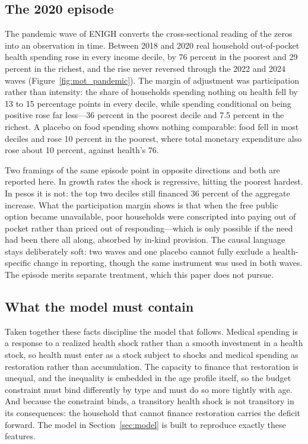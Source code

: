 \subsection{The 2020 episode}
\label{subsec:mot_pandemic}

The pandemic wave of ENIGH converts the cross-sectional reading of the zeros
into an observation in time. Between 2018 and 2020 real household out-of-pocket
health spending rose in every income decile, by 76 percent in the poorest and 29
percent in the richest, and the rise never reversed through the 2022 and 2024
waves (Figure~\ref{fig:mot_pandemic}). The margin of adjustment was
participation rather than intensity: the share of households spending nothing on
health fell by 13 to 15 percentage points in every decile, while spending
conditional on being positive rose far less---36 percent in the poorest decile
and 7.5 percent in the richest. A placebo on food spending shows nothing
comparable: food fell in most deciles and rose 10 percent in the poorest, where
total monetary expenditure also rose about 10 percent, against health's 76.

Two framings of the same episode point in opposite directions and both are
reported here. In growth rates the shock is regressive, hitting the poorest
hardest. In pesos it is not: the top two deciles still financed 36 percent of
the aggregate increase. What the participation margin shows is that when the
free public option became unavailable, poor households were conscripted into
paying out of pocket rather than priced out of responding---which is only
possible if the need had been there all along, absorbed by in-kind provision.
The causal language stays deliberately soft: two waves and one placebo cannot
fully exclude a health-specific change in reporting, though the same instrument
was used in both waves. The episode merits separate treatment, which this paper
does not pursue.

\subsection{What the model must contain}
\label{subsec:mot_bridge}

Taken together these facts discipline the model that follows. Medical spending
is a response to a realized health shock rather than a smooth investment in a
health stock, so health must enter as a stock subject to shocks and medical
spending as restoration rather than accumulation. The capacity to finance that
restoration is unequal, and the inequality is embedded in the age profile
itself, so the budget constraint must bind differently by type and must do so
more tightly with age. And because the constraint binds, a transitory health
shock is not transitory in its consequences: the household that cannot finance
restoration carries the deficit forward. The model in Section~\ref{sec:model}
is built to reproduce exactly these features.

